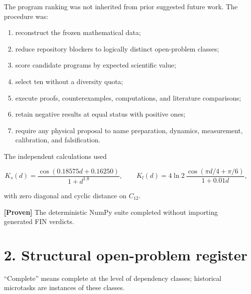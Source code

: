 \documentclass[11pt,a4paper,openany]{report}
\newcommand{\statusProven}{\textcolor{fingreen}{[Proven]}}
\begin{document}
The program ranking was not inherited from prior suggested future work. The procedure was:

\begin{enumerate}
\item 
reconstruct the frozen mathematical data;

\item 
reduce repository blockers to logically distinct open-problem classes;

\item 
score candidate programs by expected scientific value;

\item 
select ten without a diversity quota;

\item 
execute proofs, counterexamples, computations, and literature comparisons;

\item 
retain negative results at equal status with positive ones;

\item 
require any physical proposal to name preparation, dynamics, measurement, calibration, and falsification.

\end{enumerate}

The independent calculations used

\[
K_s(d)=\frac{\cos(0.18575d+0.16250)}{1+d^{1.8}},
\qquad
K_l(d)=4\ln2\,
\frac{\cos(\pi d/4+\pi/6)}{1+0.01d},
\]

with zero diagonal and cyclic distance on \(C_{12}\).

\textbf{\statusProven{}} The deterministic NumPy suite completed without importing generated FIN verdicts.

\section{2. Structural open-problem register}

“Complete” means complete at the level of dependency classes; historical microtasks are instances of these classes.
\end{document}
